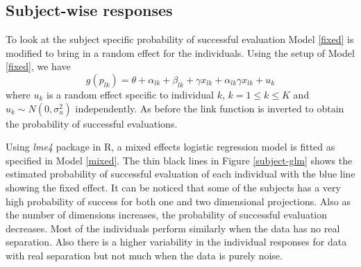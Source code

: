 \documentclass[12]{article}
\begin{document}


\subsection{Subject-wise responses}

To look at the subject specific probability of successful evaluation Model \ref{fixed} is modified to bring in  a random effect for the individuals. Using the setup of Model \ref{fixed}, we have
\begin{equation}
g(p_{lk}) = \theta + \alpha_{lk} + \beta_{lk} + \gamma x_{lk} + \alpha_{lk} \gamma x_{lk} + u_k \label{mixed} 
\end{equation}
where $u_k$ is a random effect specific to individual $k$, $k = 1 \leq k \leq K$ and $u_k \sim N(0, \sigma_u^2)$ independently. As before the link function is inverted to obtain the probability of successful evaluations.

Using \textit{lme4} package in R, a mixed effects logistic regression model is fitted as specified in Model \ref{mixed}. The thin black lines in Figure \ref{subject-glm} shows the estimated probability of successful evaluation of each individual with the blue line showing the fixed effect. It can be noticed that some of the subjects has a very high probability of success for both one and two dimensional projections. Also as the number of dimensions increases, the probability of successful evaluation decreases. Most of the individuals perform similarly when the data has no real separation. Also there is a higher variability in the individual responses for data with real separation but not much when the data is purely noise.
\end{document}
